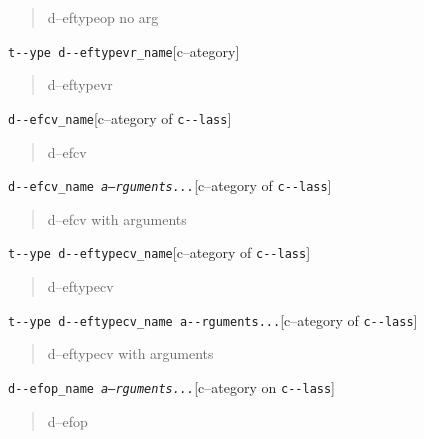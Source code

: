 \documentclass{book}
\begin{document}
%
\begin{quote}
d--eftypeop no arg
\end{quote}

\noindent\texttt{t{-}{-}ype d{-}{-}eftypevr\_name}\hfill[c--ategory]



%
\begin{quote}
d--eftypevr
\end{quote}

\noindent\texttt{d{-}{-}efcv\_name}\hfill[c--ategory of \texttt{c{-}{-}lass}]



%
\begin{quote}
d--efcv
\end{quote}

\noindent\texttt{d{-}{-}efcv\_name \EmbracOn{}\textnormal{\textsl{a--rguments...}}\EmbracOff{}}\hfill[c--ategory of \texttt{c{-}{-}lass}]



%
\begin{quote}
d--efcv with arguments
\end{quote}

\noindent\texttt{t{-}{-}ype d{-}{-}eftypecv\_name}\hfill[c--ategory of \texttt{c{-}{-}lass}]



%
\begin{quote}
d--eftypecv
\end{quote}

\noindent\texttt{t{-}{-}ype d{-}{-}eftypecv\_name a{-}{-}rguments...}\hfill[c--ategory of \texttt{c{-}{-}lass}]



%
\begin{quote}
d--eftypecv with arguments
\end{quote}

\noindent\texttt{d{-}{-}efop\_name \EmbracOn{}\textnormal{\textsl{a--rguments...}}\EmbracOff{}}\hfill[c--ategory on \texttt{c{-}{-}lass}]



%
\begin{quote}
d--efop
\end{quote}
\end{document}
